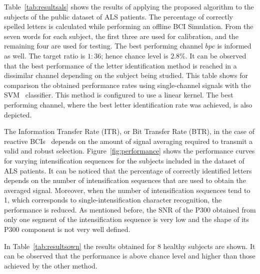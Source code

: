 \documentclass[utf8]{frontiersSCNS} %
\begin{document}
Table~\ref{tab:resultsals} shows the results of applying the proposed algorithm to the subjects of the public dataset of ALS patients. The percentage of correctly spelled letters is calculated while performing an offline BCI Simulation.  From the seven words for each subject, the first three are used for calibration, and the remaining four are used for testing.  The best performing channel  $bpc$ is informed as well. The target ratio is $1:36$; hence chance level is $2.8\%$. It can be observed that the best performance of the letter identification method is reached in a dissimilar channel depending on the subject being studied.  This table shows for comparison the obtained performance rates using single-channel signals with the SVM~\citep{Scholkopf2001} classifier.  This method is configured to use a linear kernel.  The best performing channel, where the best letter identification rate was achieved, is also depicted.


The Information Transfer Rate (ITR), or Bit Transfer Rate (BTR), in the case of reactive BCIs~\citep{WolpawJonathanR2012}  depends on the amount of signal averaging required to transmit a valid and robust selection.  Figure~\ref{fig:performance} shows the performance curves for varying intensification sequences for the subjects included in the dataset of ALS patients. It can be noticed that the percentage of correctly identified letters depends on the number of intensification sequences that are used to obtain the averaged signal.  Moreover, when the number of intensification sequences tend to 1, which corresponds to single-intensification character recognition, the performance is reduced. As mentioned before, the SNR of the P300 obtained from only one segment of the intensification sequence is very low and the shape of its P300 component is not very well defined.

In Table~\ref{tab:resultsown} the results obtained for 8 healthy subjects are shown.  It can be observed that the performance is above chance level and higher than those achieved by the other method.

\end{document}
